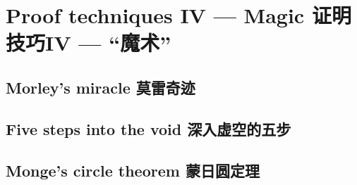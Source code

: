\chapter{Proof techniques IV --- Magic 证明技巧IV --- “魔术”}

\section{Morley's miracle 莫雷奇迹}





\newpage

\section{Five steps into the void 深入虚空的五步}





\newpage

\section{Monge's circle theorem 蒙日圆定理}





